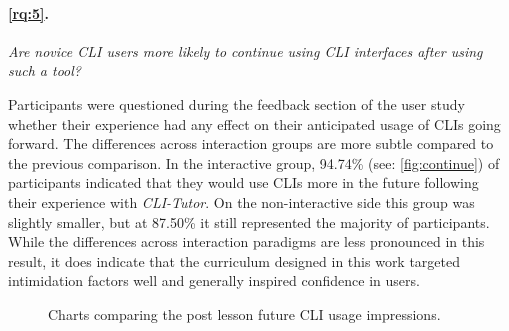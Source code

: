 \paragraph{\ref{rq:5}.} \textit{Are novice CLI users more likely to continue using CLI interfaces
after using such a tool?}

Participants were questioned during the feedback section of the user study
whether their experience had any effect on their anticipated usage of CLIs
going forward. The differences across interaction groups are more subtle
compared to the previous comparison. In the interactive group, 94.74\% (see:
\autoref{fig:continue}) of participants indicated that they would use CLIs more
in the future following their experience with \textit{CLI-Tutor}. On the
non-interactive side this group was slightly smaller, but at 87.50\% it still
represented the majority of participants. While the differences across
interaction paradigms are less pronounced in this result, it does indicate that
the curriculum designed in this work targeted intimidation factors well and
generally inspired confidence in users. 

\begin{figure}[htbp]
	\centering
	\scalebox{0.67}{}
	\caption{Charts comparing the post lesson future CLI usage impressions.}
	\label{fig:continue}
\end{figure}
